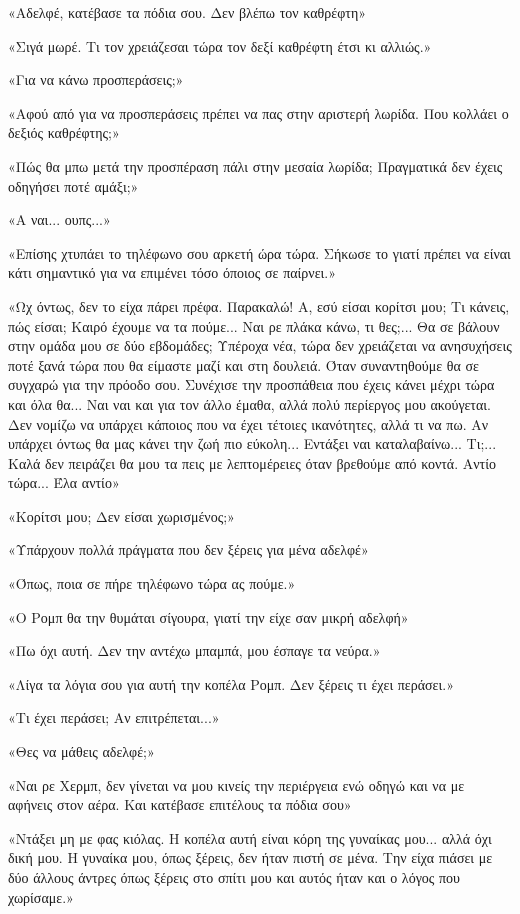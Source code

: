 \documentclass[12pt,twoside, openany]{book}
\begin{document}
«Αδελφέ, κατέβασε τα πόδια σου. Δεν βλέπω τον καθρέφτη»

«Σιγά μωρέ. Τι τον χρειάζεσαι τώρα τον δεξί καθρέφτη έτσι κι αλλιώς.»

«Για να κάνω προσπεράσεις;»

«Αφού από για να προσπεράσεις πρέπει να πας στην αριστερή λωρίδα. Που κολλάει ο δεξιός καθρέφτης;»

«Πώς θα μπω μετά την προσπέραση πάλι στην μεσαία λωρίδα; Πραγματικά δεν έχεις οδηγήσει ποτέ αμάξι;»

«Α ναι... ουπς...»

«Επίσης χτυπάει το τηλέφωνο σου αρκετή ώρα τώρα. Σήκωσε το γιατί πρέπει να είναι κάτι σημαντικό για να επιμένει τόσο όποιος σε παίρνει.»

«Ωχ όντως, δεν το είχα πάρει πρέφα. Παρακαλώ! Α, εσύ είσαι κορίτσι μου; Τι κάνεις, πώς είσαι; Καιρό έχουμε να τα πούμε... Ναι ρε πλάκα κάνω, τι θες;... Θα σε βάλουν στην ομάδα μου σε δύο εβδομάδες; Υπέροχα νέα, τώρα δεν χρειάζεται να ανησυχήσεις ποτέ ξανά τώρα που θα είμαστε μαζί και στη δουλειά. Όταν συναντηθούμε θα σε συγχαρώ για την πρόοδο σου. Συνέχισε την προσπάθεια που έχεις κάνει μέχρι τώρα και όλα θα... Ναι ναι και για τον άλλο έμαθα, αλλά πολύ περίεργος μου ακούγεται. Δεν νομίζω να υπάρχει κάποιος που να έχει τέτοιες ικανότητες, αλλά τι να πω. Αν υπάρχει όντως θα μας κάνει την ζωή πιο εύκολη... Εντάξει ναι καταλαβαίνω... Τι;... Καλά δεν πειράζει θα μου τα πεις με λεπτομέρειες όταν βρεθούμε από κοντά. Αντίο τώρα... Έλα αντίο»

«Κορίτσι μου; Δεν είσαι χωρισμένος;»

«Υπάρχουν πολλά πράγματα που δεν ξέρεις για μένα αδελφέ»

«Όπως, ποια σε πήρε τηλέφωνο τώρα ας πούμε.»

«Ο Ρομπ θα την θυμάται σίγουρα, γιατί την είχε σαν μικρή αδελφή»

«Πω όχι αυτή. Δεν την αντέχω μπαμπά, μου έσπαγε τα νεύρα.»

«Λίγα τα λόγια σου για αυτή την κοπέλα Ρομπ. Δεν ξέρεις τι έχει περάσει.»

«Τι έχει περάσει; Αν επιτρέπεται...»

«Θες να μάθεις αδελφέ;»

«Ναι ρε Χερμπ, δεν γίνεται να μου κινείς την περιέργεια ενώ οδηγώ και να με αφήνεις στον αέρα. Και κατέβασε επιτέλους τα πόδια σου»

«Ντάξει μη με φας κιόλας. Η κοπέλα αυτή είναι κόρη της γυναίκας μου... αλλά όχι δική μου. Η γυναίκα μου, όπως ξέρεις, δεν ήταν πιστή σε μένα. Την είχα πιάσει με δύο άλλους άντρες όπως ξέρεις στο σπίτι μου και αυτός ήταν και ο λόγος που χωρίσαμε.»
\end{document}

